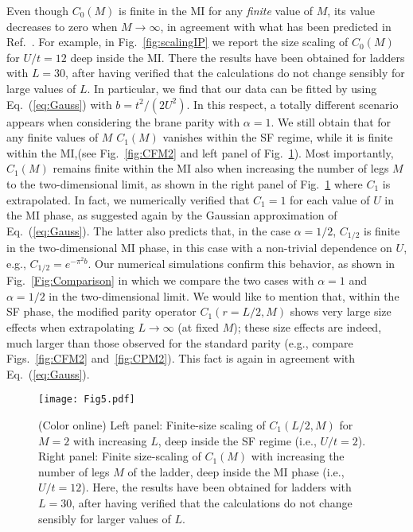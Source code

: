 \documentclass[aps,prb,floatfix,twocolumn,amsmath,amssymb]{revtex4}
\begin{document}
Even though $C_0(M)$ is finite in the MI for any {\it finite} value of $M$, its value decreases to zero when $M \to \infty$, in agreement 
with what has been predicted in Ref.~. For example, in Fig.~\ref{fig:scalingIP} we report the size scaling of $C_0(M)$ 
for $U/t=12$ deep inside the MI. There the results have been obtained for ladders with $L=30$, after having verified that the calculations 
do not change sensibly for large values of $L$. In particular, we find that our data can be fitted by using Eq.~(\ref{eq:Gauss})
with $b=t^2/(2U^2)$. In this respect, a totally different scenario appears when considering the brane parity with $\alpha=1$. We still 
obtain that for any finite values of $M$ $C_1(M)$ vanishes within the SF regime, while it is finite within the MI,(see Fig.~\ref{fig:CFM2}
and left panel of Fig.~\ref{fig:scalingFP}). Most importantly, $C_1(M)$ remains finite within the MI also when increasing the number of 
legs $M$ to the two-dimensional limit, as shown in the right panel of Fig.~\ref{fig:scalingFP} where $C_1$ is extrapolated. In fact, we 
numerically verified that $C_1=1$ for each value of $U$ in the MI phase, as suggested again by the Gaussian approximation of 
Eq.~(\ref{eq:Gauss}). The latter also predicts that, in the case $\alpha=1/2$, $C_{1/2}$ is finite in the two-dimensional MI 
phase, in this case with a non-trivial dependence on $U$, e.g., $C_{1/2}=e^{-\pi^2 b}$. Our numerical simulations confirm this behavior, 
as shown in Fig.~\ref{Fig:Comparison} in which we compare the two cases with $\alpha=1$ and $\alpha=1/2$ in the two-dimensional limit. 
We would like to mention that, within the SF phase, the modified parity operator $C_1(r=L/2,M)$ shows very large size effects 
when extrapolating $L \to \infty$ (at fixed $M$); these size effects are indeed, much larger than those observed for the standard parity 
(e.g., compare Figs.~\ref{fig:CFM2} and~\ref{fig:CPM2}). This fact is again in agreement with Eq.~(\ref{eq:Gauss}). 

\begin{figure}
\texttt{[image: Fig5.pdf]}
\caption{\label{fig:scalingFP}
(Color online) Left panel: Finite-size scaling of $C_1(L/2,M)$ for $M=2$ with increasing $L$, deep inside the SF regime (i.e., $U/t=2$).
Right panel: Finite size-scaling of {$C_1(M)$} with increasing the number of legs $M$ of the ladder, deep inside the MI phase (i.e., 
$U/t=12$). Here, the results have been obtained for ladders with $L=30$, after having verified that the calculations do not change 
sensibly for larger values of $L$.}
\end{figure}
\end{document}

